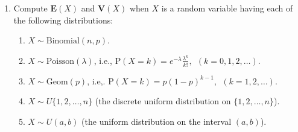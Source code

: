 \begin{enumerate}[label=\arabic*.]
(a) Prove that $A_1,A_2,\ldots$ are independent
events.

$\textbf{Hint.}$ for each $n\ge 1$, let $\pi_n$ be
the random permutation of $(1,2,\ldots,n)$ obtained
by forgetting the values of $(X_1,\ldots,X_n)$ and
only retaining their respective order. In other words,
define

\[
\pi_n(k) = \#\{1\le j\le n : X_j \le X_k\}.
\]

\noindent By considering the joint density $f_{X_1,\ldots,X_n}$
(a uniform density on the $n$-dimensional unit cube),
show that $\pi_n$ is a uniformly random permutation
of $n$ elements, i.e.
$\mathrm{P}(\pi_n = \sigma) = 1/n!$ for any
permutation $\sigma \in S_n$. Deduce that the event
$A_n = \{\pi_n(n)=n\}$ is independent of $\pi_{n-1}$
and therefore is independent of the previous events
$(A_1,\ldots,A_{n-1})$, which are all determined by
$\pi_{n-1}$.

(b) Define

\[
R_n = \sum_{k=1}^n 1_{A_k} = \#\{ 1\le k\le n: k\textrm{ is a record time} \}, \qquad (n=1,2,\ldots).
\]

\noindent Compute $\mathbf{E}(R_n)$ and $\mathbf{V}(R_n)$.
Deduce that if $(m_n)_{n=1}^\infty$ is a sequence of
positive numbers such that $m_n \uparrow \infty$,
however slowly, then the number $R_n$ of record times
up to time $n$ satisfies

\[
\mathrm{P}\left(|R_n - \log n|>m_n \sqrt{\log n}\right) \xrightarrow[n\to\infty]{} 0.
\]

\item Compute $\mathbf{E}(X)$ and $\mathbf{V}(X)$ when $X$
is a random variable having each of the following
distributions:

\begin{enumerate}[label=\arabic*.]
\item $X \sim \textrm{Binomial}(n,p)$.

\item $X \sim \textrm{Poisson}(\lambda)$, i.e.,
$\mathrm{P}(X=k)=e^{-\lambda} \frac{\lambda^k}{k!}, \
\ (k=0,1,2,\ldots)$.

\item $X \sim \textrm{Geom}(p)$, i.e,.
$\mathrm{P}(X=k)=p(1-p)^{k-1}, \ \ (k=1,2,\ldots)$.

\item $X \sim U\{1,2,\ldots,n\}$ (the discrete uniform
distribution on $\{1,2,\ldots,n\}$).

\item $X \sim U(a,b)$ (the uniform distribution on the
interval $(a,b)$).


\end{enumerate}
\end{enumerate}
